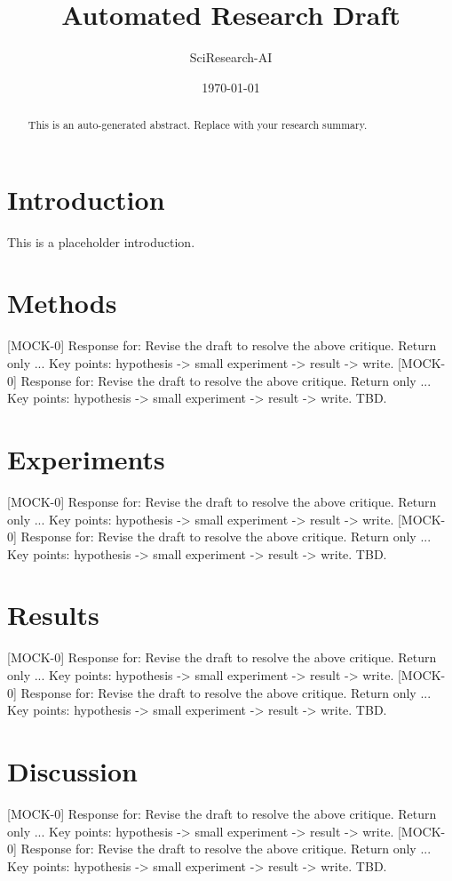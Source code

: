 \documentclass{article}
\title{Automated Research Draft}
\author{SciResearch-AI}
\date{\today}
\begin{document}
\maketitle

\begin{abstract}
This is an auto-generated abstract. Replace with your research summary.
\end{abstract}

\section{Introduction}
This is a placeholder introduction.

\section{Methods}
[MOCK-0] Response for: Revise the draft to resolve the above critique. Return only ...
Key points: hypothesis -> small experiment -> result -> write.
[MOCK-0] Response for: Revise the draft to resolve the above critique. Return only ...
Key points: hypothesis -> small experiment -> result -> write.
TBD.

\section{Experiments}
[MOCK-0] Response for: Revise the draft to resolve the above critique. Return only ...
Key points: hypothesis -> small experiment -> result -> write.
[MOCK-0] Response for: Revise the draft to resolve the above critique. Return only ...
Key points: hypothesis -> small experiment -> result -> write.
TBD.

\section{Results}
[MOCK-0] Response for: Revise the draft to resolve the above critique. Return only ...
Key points: hypothesis -> small experiment -> result -> write.
[MOCK-0] Response for: Revise the draft to resolve the above critique. Return only ...
Key points: hypothesis -> small experiment -> result -> write.
TBD.

\section{Discussion}
[MOCK-0] Response for: Revise the draft to resolve the above critique. Return only ...
Key points: hypothesis -> small experiment -> result -> write.
[MOCK-0] Response for: Revise the draft to resolve the above critique. Return only ...
Key points: hypothesis -> small experiment -> result -> write.
TBD.



\end{document}
